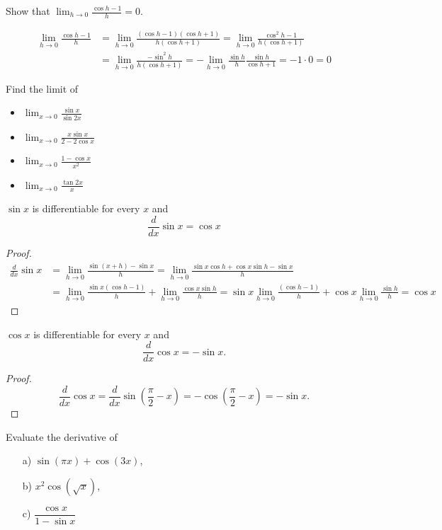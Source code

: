 \documentclass[../calc1-main.tex]{subfiles}
\begin{document}
  \begin{example}
    Show that $\lim_{h \to 0} \frac{\cos h - 1}{h} = 0$.
  \end{example}
  \begin{solution}
    \[
      \begin{split}
      \lim_{h \to 0} \frac{\cos h - 1}{h} & =
      \lim_{h \to 0} \frac{(\cos h - 1)(\cos h + 1)}{h(\cos h + 1)} =
      \lim_{h \to 0} \frac{\cos^2 h - 1}{h(\cos h + 1)} \\
      &= \lim_{h \to 0} \frac{-\sin^2 h}{h(\cos h + 1)}
      = -\lim_{h \to 0} \frac{\sin h}{h} \frac{\sin h}{\cos h + 1} = -1 \cdot 0 = 0
      \end{split}
    \]
  \end{solution}

  \begin{example}
    Find the limit of
    \begin{itemize}
      \item $\lim_{x \to 0} \frac{\sin x}{\sin 2x}$
      \item $\lim_{x \to 0} \frac{x \sin x}{2-2\cos x}$
      \item $\lim_{x \to 0} \frac{1-\cos x}{x^2}$
      \item $\lim_{x \to 0} \frac{\tan 2x}{x}$
    \end{itemize}
  \end{example}
  \begin{theorem}
    $\sin x$ is differentiable for every $x$ and
    \[
      \frac{d}{dx} \sin x = \cos x
    \]
  \end{theorem}
  \begin{proof}
    \[
      \begin{split}
        \frac{d}{dx} \sin x & =
        \lim_{h \to 0} \frac{\sin(x+h) - \sin x}{h} =
        \lim_{h \to 0} \frac{\sin x \cos h + \cos x \sin h - \sin x}{h}\\ &=
        \lim_{h \to 0} \frac{\sin x (\cos h-1)}{h} + \lim_{h \to 0} \frac{\cos x \sin h}{h} =
        \sin x \lim_{h \to 0} \frac{(\cos h-1)}{h} + \cos x \lim_{h \to 0} \frac{\sin h}{h} = \cos x
      \end{split}
    \]
  \end{proof}

  \begin{theorem}
    $\cos x$ is differentiable for every $x$ and
    \[
      \frac{d}{dx} \cos x = -\sin x.
    \]
  \end{theorem}
  \begin{proof}
    \[
      \frac{d}{dx} \cos x =
      \frac{d}{dx} \sin\left(\frac{\pi}{2} -x\right) =
      - \cos\left(\frac{\pi}{2} -x\right) = - \sin x.
    \]
  \end{proof}
  \begin{example}
    Evaluate the derivative of
    \begin{itemize}
      \item[a)] $\sin(\pi x) + \cos(3x)$,
      \item[b)] $x^2 \cos(\sqrt{x})$,
      \item[c)] $\dfrac{\cos x}{1- \sin x}$
    \end{itemize}
  \end{example}
\end{document}
